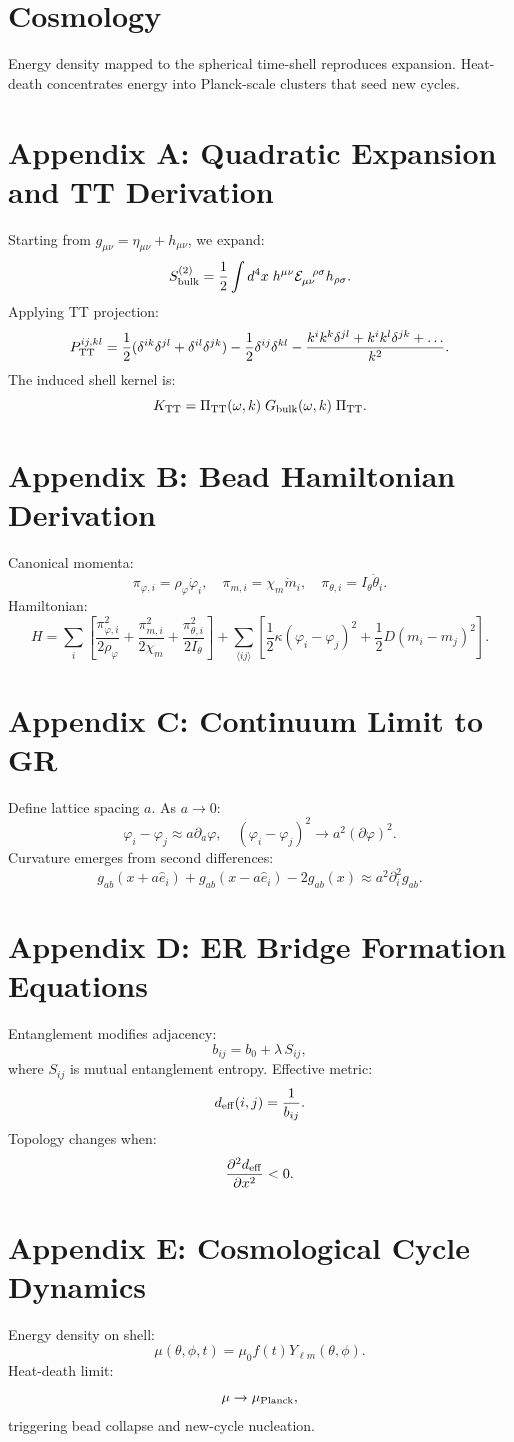 \documentclass[12pt]{article}
\begin{document}
\section{Cosmology}
Energy density mapped to the spherical time-shell reproduces expansion. Heat-death 
concentrates energy into Planck-scale clusters that seed new cycles.

\newpage
\appendix

\section{Appendix A: Quadratic Expansion and TT Derivation}
Starting from $g_{\mu\nu}=\eta_{\mu\nu}+h_{\mu\nu}$, we expand:
\[
S_{\rm bulk}^{(2)} = \frac{1}{2}\int d^4x\; h^{\mu\nu}\mathcal E_{\mu\nu}^{\ \ \rho\sigma}h_{\rho\sigma}.
\]
Applying TT projection:
\[
P_{\rm TT}^{ij,kl} = 
\frac12(\delta^{ik}\delta^{jl} + \delta^{il}\delta^{jk})
- \frac12\delta^{ij}\delta^{kl}
- \frac{k^i k^k \delta^{jl} + k^i k^l \delta^{jk}+\dots}{k^2}.
\]
The induced shell kernel is:
\[
K_{\rm TT} = \Pi_{\rm TT}(\omega,k)\;G_{\rm bulk}(\omega,k)\;\Pi_{\rm TT}.
\]

\section{Appendix B: Bead Hamiltonian Derivation}
Canonical momenta:
\[
\pi_{\varphi,i} = \rho_\varphi \dot{\varphi}_i,\quad
\pi_{m,i} = \chi_m\dot{m}_i,\quad
\pi_{\theta,i}=I_\theta \dot{\theta}_i.
\]
Hamiltonian:
\[
H = \sum_i\left[
\frac{\pi_{\varphi,i}^2}{2\rho_\varphi}
+ \frac{\pi_{m,i}^2}{2\chi_m}
+ \frac{\pi_{\theta,i}^2}{2I_\theta}
\right]
+ \!\sum_{\langle ij\rangle}\!
\left[\frac12\kappa(\varphi_i-\varphi_j)^2
+ \frac12D(m_i-m_j)^2\right].
\]

\section{Appendix C: Continuum Limit to GR}
Define lattice spacing $a$. As $a\to 0$:
\[
\varphi_i - \varphi_j \approx a\partial_a\varphi,
\quad
(\varphi_i - \varphi_j)^2 \to a^2(\partial\varphi)^2.
\]
Curvature emerges from second differences:
\[
g_{ab}(x+a\hat{e}_i) + g_{ab}(x-a\hat{e}_i) -2g_{ab}(x)
\approx a^2\partial_i^2 g_{ab}.
\]

\section{Appendix D: ER Bridge Formation Equations}
Entanglement modifies adjacency:
\[
b_{ij} = b_0 + \lambda\,S_{ij},
\]
where $S_{ij}$ is mutual entanglement entropy. Effective metric:
\[
d_{\rm eff}(i,j) = \frac{1}{b_{ij}}.
\]
Topology changes when:
\[
\frac{\partial^2 d_{\rm eff}}{\partial x^2} < 0.
\]

\section{Appendix E: Cosmological Cycle Dynamics}
Energy density on shell:
\[
\mu(\theta,\phi,t) = \mu_0 f(t)Y_{\ell m}(\theta,\phi).
\]
Heat-death limit:
\[
\mu \to \mu_{\rm Planck},
\]
triggering bead collapse and new-cycle nucleation.
\end{document}
